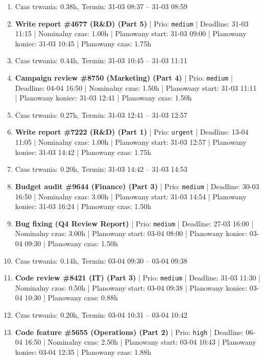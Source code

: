 {\begin{enumerate}
  \item [\textbf{PRZERWA}] Czas trwania: 0.38h, Termin: 31-03 08:37 -- 31-03 08:59
  \item [\textbf{14640}] \textbf{Write report \#4677 (R\&D) (Part 5)} | Prio: \texttt{medium} | Deadline: 31-03 11:15 | Nominalny czas: 1.00h | Planowany start: 31-03 09:00 | Planowany koniec: 31-03 10:45 | Planowany czas: 1.75h
  \item [\textbf{PRZERWA}] Czas trwania: 0.44h, Termin: 31-03 10:45 -- 31-03 11:11
  \item [\textbf{14632}] \textbf{Campaign review \#8750 (Marketing) (Part 4)} | Prio: \texttt{medium} | Deadline: 04-04 16:50 | Nominalny czas: 1.50h | Planowany start: 31-03 11:11 | Planowany koniec: 31-03 12:41 | Planowany czas: 1.50h
  \item [\textbf{PRZERWA}] Czas trwania: 0.27h, Termin: 31-03 12:41 -- 31-03 12:57
  \item [\textbf{14601}] \textbf{Write report \#7222 (R\&D) (Part 1)} | Prio: \texttt{urgent} | Deadline: 13-04 11:05 | Nominalny czas: 1.00h | Planowany start: 31-03 12:57 | Planowany koniec: 31-03 14:42 | Planowany czas: 1.75h
  \item [\textbf{PRZERWA}] Czas trwania: 0.20h, Termin: 31-03 14:42 -- 31-03 14:53
  \item [\textbf{14659}] \textbf{Budget audit \#9644 (Finance) (Part 3)} | Prio: \texttt{medium} | Deadline: 30-03 16:50 | Nominalny czas: 3.00h | Planowany start: 31-03 14:54 | Planowany koniec: 31-03 16:24 | Planowany czas: 1.50h
  \item [\textbf{14647}] \textbf{Bug fixing (Q4 Review Report)} | Prio: \texttt{medium} | Deadline: 27-03 16:00 | Nominalny czas: 3.00h | Planowany start: 03-04 08:00 | Planowany koniec: 03-04 09:30 | Planowany czas: 1.50h
  \item [\textbf{PRZERWA}] Czas trwania: 0.14h, Termin: 03-04 09:30 -- 03-04 09:38
  \item [\textbf{14665}] \textbf{Code review \#8421 (IT) (Part 3)} | Prio: \texttt{medium} | Deadline: 31-03 11:30 | Nominalny czas: 0.50h | Planowany start: 03-04 09:38 | Planowany koniec: 03-04 10:30 | Planowany czas: 0.88h
  \item [\textbf{PRZERWA}] Czas trwania: 0.20h, Termin: 03-04 10:31 -- 03-04 10:42
  \item [\textbf{14626}] \textbf{Code feature \#5655 (Operations) (Part 2)} | Prio: \texttt{high} | Deadline: 06-04 16:50 | Nominalny czas: 2.50h | Planowany start: 03-04 10:43 | Planowany koniec: 03-04 12:35 | Planowany czas: 1.88h

\end{enumerate}}
